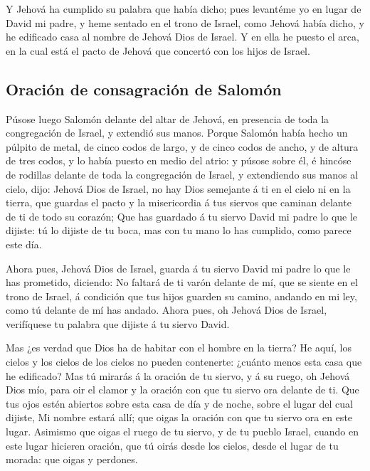  Y Jehová ha cumplido su palabra que había dicho; pues
levantéme yo en lugar de David mi padre, y heme sentado en el trono de
Israel, como Jehová había dicho, y he edificado casa al nombre de Jehová
Dios de Israel.  Y en ella he puesto el arca, en la cual
está el pacto de Jehová que concertó con los hijos de Israel.

\hypertarget{oraciuxf3n-de-consagraciuxf3n-de-salomuxf3n}{%
\subsection{Oración de consagración de
Salomón}\label{oraciuxf3n-de-consagraciuxf3n-de-salomuxf3n}}

 Púsose luego Salomón delante del altar de Jehová, en
presencia de toda la congregación de Israel, y extendió sus manos.
 Porque Salomón había hecho un púlpito de metal, de cinco
codos de largo, y de cinco codos de ancho, y de altura de tres codos, y
lo había puesto en medio del atrio: y púsose sobre él, é hincóse de
rodillas delante de toda la congregación de Israel, y extendiendo sus
manos al cielo, dijo:  Jehová Dios de Israel, no hay Dios
semejante á ti en el cielo ni en la tierra, que guardas el pacto y la
misericordia á tus siervos que caminan delante de ti de todo su corazón;
 Que has guardado á tu siervo David mi padre lo que le
dijiste: tú lo dijiste de tu boca, mas con tu mano lo has cumplido, como
parece este día.

 Ahora pues, Jehová Dios de Israel, guarda á tu siervo
David mi padre lo que le has prometido, diciendo: No faltará de ti varón
delante de mí, que se siente en el trono de Israel, á condición que tus
hijos guarden su camino, andando en mi ley, como tú delante de mí has
andado.  Ahora pues, oh Jehová Dios de Israel,
verifíquese tu palabra que dijiste á tu siervo David.

 Mas ¿es verdad que Dios ha de habitar con el hombre en
la tierra? He aquí, los cielos y los cielos de los cielos no pueden
contenerte: ¿cuánto menos esta casa que he edificado? 
Mas tú mirarás á la oración de tu siervo, y á su ruego, oh Jehová Dios
mío, para oir el clamor y la oración con que tu siervo ora delante de
ti.  Que tus ojos estén abiertos sobre esta casa de día y
de noche, sobre el lugar del cual dijiste, Mi nombre estará allí; que
oigas la oración con que tu siervo ora en este lugar. 
Asimismo que oigas el ruego de tu siervo, y de tu pueblo Israel, cuando
en este lugar hicieren oración, que tú oirás desde los cielos, desde el
lugar de tu morada: que oigas y perdones.

